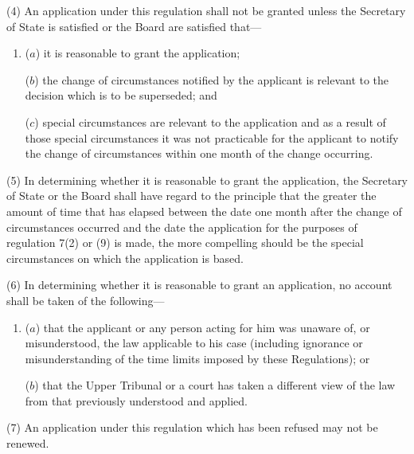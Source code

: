 \documentclass[12pt,a4paper]{article}
\begin{document}
(4) An application under this regulation shall not be granted unless the Secretary of State is satisfied 
or the Board are satisfied  %
that—
\begin{enumerate}\item[]
($a$) it is reasonable to grant the application;

($b$) the change of circumstances notified by the applicant is relevant to the decision which is to be superseded; and

($c$) special circumstances are relevant to the application and as a result of those special circumstances it was not practicable for the applicant to notify the change of circumstances within one month of the change occurring.
\end{enumerate}

(5) In determining whether it is reasonable to grant the application, the Secretary of State 
or the Board  %
shall have regard to the principle that the greater the amount of time that has elapsed between the date one month after the change of circumstances occurred and the date the application for the purposes of regulation 7(2) 
or (9)  %
is made, the more compelling should be the special circumstances on which the application is based.

(6) In determining whether it is reasonable to grant an application, no account shall be taken of the following—
\begin{enumerate}\item[]
($a$) that the applicant or any person acting for him was unaware of, or misunderstood, the law applicable to his case (including ignorance or misunderstanding of the time limits imposed by these Regulations); or

($b$) that 
the Upper Tribunal  %
or a court has taken a different view of the law from that previously understood and applied.
\end{enumerate}

(7) An application under this regulation which has been refused may not be renewed.

\end{document}
